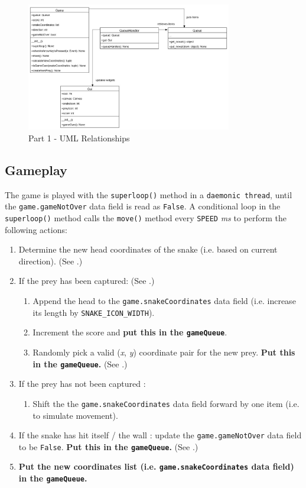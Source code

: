 \documentclass{article}
\begin{document}
\begin{figure}[H]
    \centering
     \includegraphics[width=0.8\textwidth]{../Part_1_ClassDiagrams.jpg}
     \caption{Part 1 - UML Relationships}
     \label{fig:Part1_ClassDiagrams}
 \end{figure}

\subsection{Gameplay}

The game is played with the \texttt{superloop()} method in a \texttt{daemonic thread}, until the \texttt{game.gameNotOver} data field is read as \texttt{False}.
A conditional loop in the \texttt{superloop()} method calls the \texttt{move()} method
every \texttt{SPEED} \textit{ms} to perform the following actions:

\begin{enumerate}
    \item Determine the new head coordinates of the snake (i.e. based on current direction). (See .)
    \item If the prey has been captured: (See .)
    \begin{enumerate}
        \item Append the head to the \texttt{game.snakeCoordinates} data field (i.e. increase its length by \texttt{SNAKE\_ICON\_WIDTH}).
        \item Increment the score and \textbf{put this in the \texttt{gameQueue}}.
        \item Randomly pick a valid (\textit{x}, \textit{y}) coordinate pair for the new prey. \textbf{Put this in the \texttt{gameQueue}.} (See .)
    \end{enumerate}
    \item If the prey has not been captured :
    \begin{enumerate}
        \item Shift the the \texttt{game.snakeCoordinates} data field forward by one item (i.e. to simulate movement).
    \end{enumerate}
    \item If the snake has hit itself / the wall : update the \texttt{game.gameNotOver} data field to be \texttt{False}. \textbf{Put this in the \texttt{gameQueue}.} (See .)
    \item\textbf{Put the new coordinates list (i.e. \texttt{game.snakeCoordinates} data field) in the \texttt{gameQueue}.}
\end{enumerate}
\end{document}
